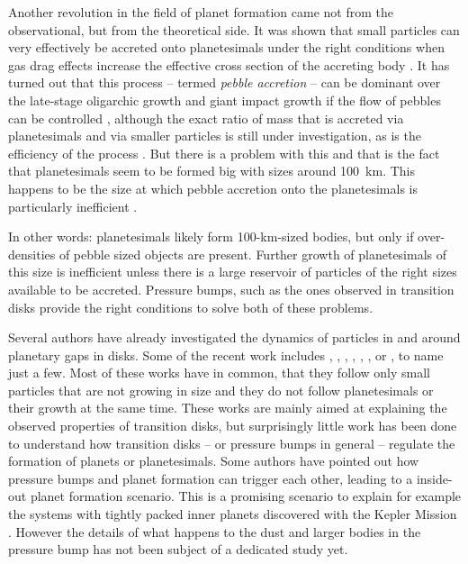 \documentclass[10pt,fleqn,twoside]{article}
\begin{document}
Another revolution in the field of planet formation came not from the
observational, but from the theoretical side. It was shown that small
particles can very effectively be accreted onto planetesimals under
the right conditions when gas drag effects increase the effective
cross section of the accreting body
\citep{2010A&A...520A..43O,2012A&A...544A..32L}. It has turned out
that this process -- termed \textit{pebble accretion} -- can be
dominant over the late-stage oligarchic growth and giant impact growth
if the flow of pebbles can be controlled \citep{2015Natur.524..322L},
although the exact ratio of mass that is accreted via planetesimals
and via smaller particles is still under investigation, as is the
efficiency of the process
\citep[see][]{2014A&A...572A..72G,2016A&A...586A..66V,2016arXiv160708250O}.
But there is a problem with this and that is the fact that
planetesimals seem to be formed big \citep[][Klahr et al., submitted
to Nature]{2009Icar..204..558M} with sizes around \SI{100}{km}. This
happens to be the size at which pebble accretion onto the
planetesimals is particularly inefficient \citep{2016A&A...586A..66V}.

\begin{highlight}
In other words: planetesimals likely form 100-km-sized bodies, but
only if over-densities of pebble sized objects are present. Further
growth of planetesimals of this size is inefficient unless there is a
large reservoir of particles of the right sizes available to be
accreted. Pressure bumps, such as the ones observed in transition
disks provide the right conditions to solve both of these problems.
\end{highlight}

Several authors have already investigated the dynamics of particles in
and around planetary gaps in disks. Some of the recent work includes
\citet{2004A&A...425L...9P,2006A&A...453.1129P},
\citet{2006MNRAS.373.1619R}, \citet{2009A&A...493.1125L},
\citet{2012ApJ...755....6Z}, \citet{2012A&A...547A..58G},
\citet{2013A&A...553L...3A}, or \citet{2015A&A...584A.110P}, to name
just a few. Most of these works have in common, that they follow only
small particles that are not growing in size and they do not follow
planetesimals or their growth at the same time. These works are mainly
aimed at explaining the observed properties of transition disks, but
surprisingly little work has been done to understand how transition
disks -- or pressure bumps in general -- regulate the formation of
planets or planetesimals. Some authors \citep[e.g.,][and following
papers in that series]{2014ApJ...780...53C} have pointed out how
pressure bumps and planet formation can trigger each other, leading to
a inside-out planet formation scenario. This is a promising scenario
to explain for example the systems with tightly packed inner planets
discovered with the Kepler Mission \citep{2012ApJ...761...92F}.
However the details of what happens to the dust and larger bodies in
the pressure bump has not been subject of a dedicated study yet.
\end{document}
